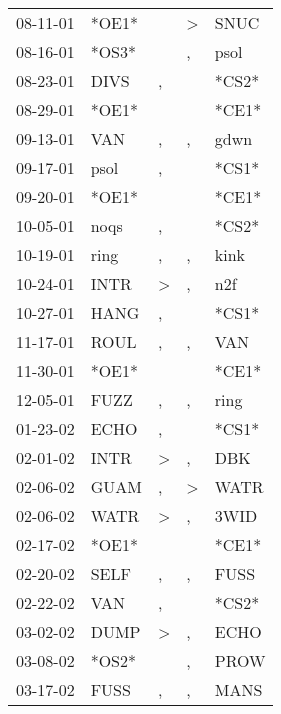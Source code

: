 \begin{supertabular}{lllll}
 08-11-01 &  *OE1* &                  &     \textgreater &   SNUC \\
 08-16-01 &  *OS3* &                  &                , &   psol \\
 08-23-01 &   DIVS &                , &                  &  *CS2* \\
 08-29-01 &  *OE1* &                  &                  &  *CE1* \\
 09-13-01 &    VAN &                , &                , &   gdwn \\
 09-17-01 &   psol &                , &                  &  *CS1* \\
 09-20-01 &  *OE1* &                  &                  &  *CE1* \\
 10-05-01 &   noqs &                , &                  &  *CS2* \\
 10-19-01 &   ring &                , &                , &   kink \\
 10-24-01 &   INTR &     \textgreater &                , &    n2f \\
 10-27-01 &   HANG &                , &                  &  *CS1* \\
 11-17-01 &   ROUL &                , &                , &    VAN \\
 11-30-01 &  *OE1* &                  &                  &  *CE1* \\
 12-05-01 &   FUZZ &                , &                , &   ring \\
 01-23-02 &   ECHO &                , &                  &  *CS1* \\
 02-01-02 &   INTR &     \textgreater &                , &    DBK \\
 02-06-02 &   GUAM &                , &     \textgreater &   WATR \\
 02-06-02 &   WATR &     \textgreater &                , &   3WID \\
 02-17-02 &  *OE1* &                  &                  &  *CE1* \\
 02-20-02 &   SELF &                , &                , &   FUSS \\
 02-22-02 &    VAN &                , &                  &  *CS2* \\
 03-02-02 &   DUMP &     \textgreater &                , &   ECHO \\
 03-08-02 &  *OS2* &                  &                , &   PROW \\
 03-17-02 &   FUSS &                , &                , &   MANS \\

\end{supertabular}
